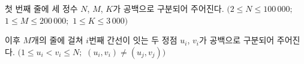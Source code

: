 첫 번째 줄에 세 정수 $N$, $M$, $K$가 공백으로 구분되어 주어진다. $(2 \le N \le 100\, 000;$ $1 \le M \le 200\, 000;$ $1 \le K \le 3\, 000)$

이후 $M$개의 줄에 걸쳐 $i$번째 간선이 잇는 두 정점 $u_i$, $v_i$가 공백으로 구분되어 주어진다. $(1 \le u_i \lt v_i \le N;$ $(u_i, v_i) \ne (u_j, v_j) )$